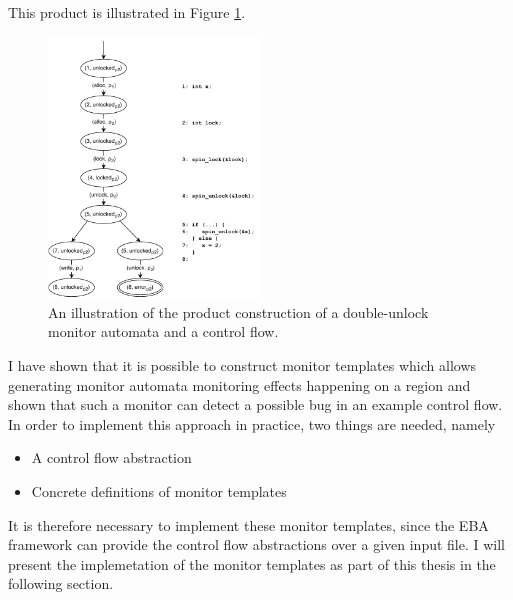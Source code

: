\noindent This product is illustrated in Figure \ref{cfg_unlock-product}. 

\begin{figure}[H]
    \centering
    \includegraphics[width=0.5\textwidth]{algorithm/figures/cfg_unlock-product}
    \caption{An illustration of the product construction of a double-unlock monitor automata and a control flow.}
    \label{cfg_unlock-product}
\end{figure}

\newpar I have shown that it is possible to construct monitor templates which allows generating monitor automata monitoring effects happening on a region and shown that such a monitor can detect a possible bug in an example control flow. In order to implement this approach in practice, two things are needed, namely

\begin{itemize}
    \item A control flow abstraction
    \item Concrete definitions of monitor templates
\end{itemize}

\noindent It is therefore necessary to implement these monitor templates, since the EBA framework can provide the control flow abstractions over a given input file. I will present the implemetation of the monitor templates as part of this thesis in the following section. 